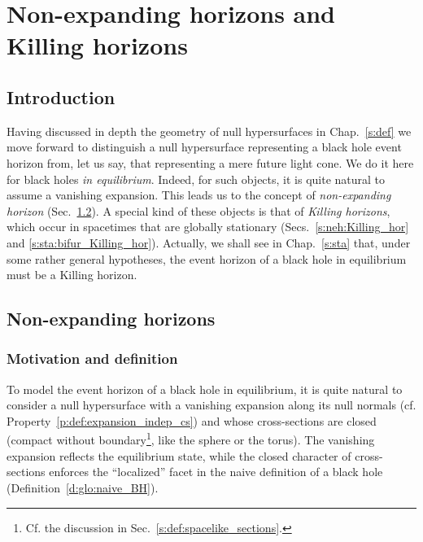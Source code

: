 \chapter{Non-expanding horizons and Killing horizons}
\label{s:neh}

\minitoc

\section{Introduction}

Having discussed in depth the geometry of null hypersurfaces in Chap.~\ref{s:def}
we move forward to distinguish a null hypersurface representing a black hole event horizon from, let us say, that representing a mere future light cone. We do it here for black holes
\emph{in equilibrium}. Indeed, for such objects, it is quite natural
to assume a vanishing expansion. This leads us to the concept of \emph{non-expanding
horizon} (Sec.~\ref{s:neh:neh}). A special kind of these objects is that
of \emph{Killing horizons}, which occur in spacetimes that are globally
stationary (Secs.~\ref{s:neh:Killing_hor} and \ref{s:sta:bifur_Killing_hor}). Actually, we shall
see in Chap.~\ref{s:sta} that, under some rather general hypotheses, the event horizon of a black hole in equilibrium
must be a Killing horizon.



\section{Non-expanding horizons} \label{s:neh:neh}

\subsection{Motivation and definition} \label{s:neh:def}

To model the event horizon of a black hole in equilibrium, it is quite
natural to consider a null hypersurface with a vanishing expansion along
its null normals (cf. Property~\ref{p:def:expansion_indep_cs}) and whose cross-sections are
closed (compact without boundary\footnote{Cf. the discussion in Sec.~\ref{s:def:spacelike_sections}.}, like the sphere or the torus). The vanishing expansion reflects the equilibrium state, while
the closed character of cross-sections enforces the ``localized'' facet
in the naive definition of a black hole (Definition~\ref{d:glo:naive_BH}).


